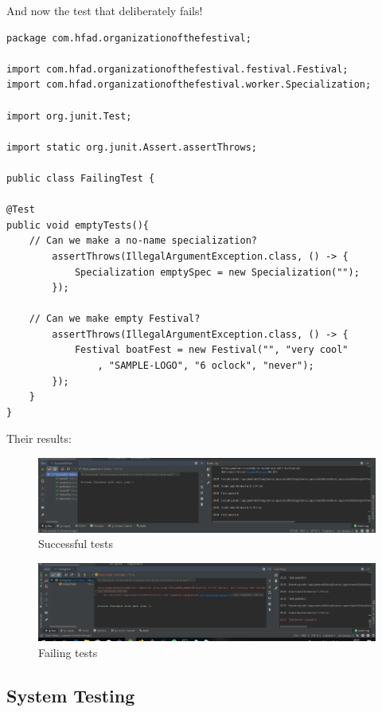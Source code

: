 			And now the test that deliberately fails!
			\begin{lstlisting}
package com.hfad.organizationofthefestival;

import com.hfad.organizationofthefestival.festival.Festival;
import com.hfad.organizationofthefestival.worker.Specialization;

import org.junit.Test;

import static org.junit.Assert.assertThrows;

public class FailingTest {

@Test
public void emptyTests(){
	// Can we make a no-name specialization?
		assertThrows(IllegalArgumentException.class, () -> {
			Specialization emptySpec = new Specialization("");
		});

	// Can we make empty Festival?
		assertThrows(IllegalArgumentException.class, () -> {
			Festival boatFest = new Festival("", "very cool"
				, "SAMPLE-LOGO", "6 oclock", "never");
		});
	}
}
			\end{lstlisting}
			
			Their results:
			\begin{figure}[H]
				\includegraphics[width=\linewidth]{images/JUnit_1.png}
				\caption{Successful tests}
				\label{fig:junit_1}
			\end{figure}
		
			\begin{figure}[H]
				\includegraphics[width=\linewidth]{images/JUnit_2.png}
				\caption{Failing tests}
				\label{fig:junit_2}
			\end{figure}
			
			\subsection{System Testing}
			
